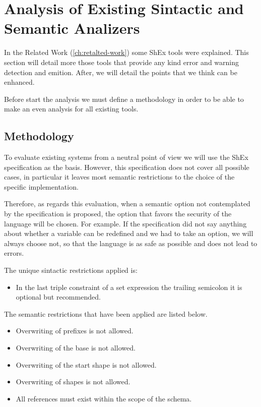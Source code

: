 \chapter{Analysis of Existing Sintactic and Semantic Analizers}
\label{ch:current-analyzers-analysis}

In the Related Work (\cref{ch:retalted-work}) some ShEx tools were explained. This section will detail more
those tools that provide any kind error and warning detection and emition. After, we will detail the points
that we think can be enhanced.

Before start the analysis we must define a methodology in order to be able to make an even analysis for all
existing tools.

\section{Methodology}
To evaluate existing systems from a neutral point of view we will use the ShEx specification as the basis.
However, this specification does not cover all possible cases, in particular it leaves most semantic restrictions
to the choice of the specific implementation.

Therefore, as regards this evaluation, when a semantic option not contemplated by the specification is proposed,
the option that favors the security of the language will be chosen. For example. If the specification did not say
anything about whether a variable can be redefined and we had to take an option, we will always choose not, so that
the language is as safe as possible and does not lead to errors.

The unique sintactic restrictions applied is:
\begin{itemize}
  \item In the last triple constraint of a set expression the trailing semicolon it is optional but recommended.
\end{itemize}

The semantic restrictions that have been applied are listed below.
\begin{itemize}
  \item Overwriting of prefixes is not allowed.
  \item Overwriting of the base is not allowed.
  \item Overwriting of the start shape is not allowed.
  \item Overwriting of shapes is not allowed.
  \item All references must exist within the scope of the schema.
\end{itemize}

